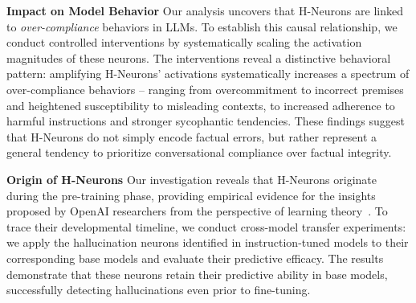 \documentclass[dvipsnames]{article}
\begin{document}
\textbf{Impact on Model Behavior}\quad
Our analysis uncovers that H-Neurons are linked to \textit{over-compliance} behaviors in LLMs. To establish this causal relationship, we conduct controlled interventions by systematically scaling the activation magnitudes of these neurons. The interventions reveal a distinctive behavioral pattern: amplifying H-Neurons' activations systematically increases a spectrum of over-compliance behaviors -- ranging from overcommitment to incorrect premises and heightened susceptibility to misleading contexts, to increased adherence to harmful instructions and stronger sycophantic tendencies. These findings suggest that H-Neurons do not simply encode factual errors, but rather represent a general tendency to prioritize conversational compliance over factual integrity.

\textbf{Origin of H-Neurons}\quad
Our investigation reveals that H-Neurons originate during the pre-training phase, providing empirical evidence for the insights proposed by OpenAI researchers from the perspective of learning theory~\citep{DBLP:journals/corr/abs-2509-04664}. To trace their developmental timeline, we conduct cross-model transfer experiments: we apply the hallucination neurons identified in instruction-tuned models to their corresponding base models and evaluate their predictive efficacy. The results demonstrate that these neurons retain their predictive ability in base models, successfully detecting hallucinations even prior to fine-tuning.

\end{document}
